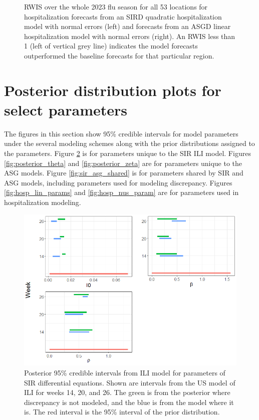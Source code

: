 \documentclass{article}
\begin{document}
\begin{figure}
\begin{subfigure}{.5\textwidth}
\end{subfigure}
\caption{RWIS over the whole 2023 flu season for all 53 locations for hospitalization forecasts from an SIRD quadratic hospitalization model with normal errors (left) and forecasts from an ASGD linear hospitalization model with normal errors (right). An RWIS less than 1 (left of vertical grey line) indicates the model forecasts outperformed the baseline forecasts for that particular region.}
\label{fig:state_median_points}
\end{figure}






\section{Posterior distribution plots for select parameters}
\label{app:B_prior}

The figures in this section show 95\% credible intervals for model parameters under the several modeling schemes along with the prior distributions assigned to the parameters. Figure \ref{fig:posterior_theta_sir} is for parameters unique to the SIR ILI model. Figures \ref{fig:posterior_theta} and \ref{fig:posterior_zeta} are for parameters unique to the ASG models. Figure \ref{fig:sir_asg_shared} is for parameters shared by SIR and ASG models, including parameters used for modeling discrepancy. Figures \ref{fig:hosp_lin_params} and \ref{fig:hosp_nus_param} are for parameters used in hospitalization modeling.


\begin{figure}
    \centering
    \includegraphics[scale=.6]{../../Images/posterior_theta_sir.png}
    \caption{Posterior 95\% credible intervals from ILI model for parameters of SIR differential equations. Shown are intervals from the US model of ILI for weeks 14, 20, and 26. The green is from the posterior where discrepancy is not modeled, and the blue is from the model where it is. The red interval is the 95\% interval of the prior distribution.}
    \label{fig:posterior_theta_sir}
\end{figure}
\end{document}
